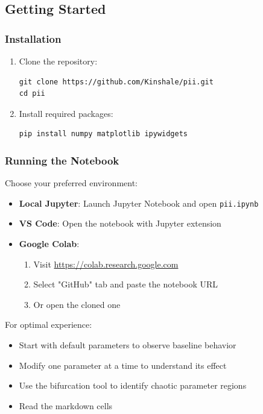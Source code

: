 \documentclass[a4paper, 10pt]{article}
\begin{document}
\subsection{Getting Started}
\subsubsection{Installation}
\begin{enumerate}
    \item Clone the repository:
    \begin{lstlisting}[style=bashstyle]
git clone https://github.com/Kinshale/pii.git
cd pii
    \end{lstlisting}

    \item Install required packages:
    \begin{lstlisting}[style=bashstyle]
pip install numpy matplotlib ipywidgets
    \end{lstlisting}
\end{enumerate}

\subsubsection{Running the Notebook}
Choose your preferred environment:
\begin{itemize}
	\item \textbf{Local Jupyter}: Launch Jupyter Notebook and open \texttt{pii.ipynb}
	\item \textbf{VS Code}: Open the notebook with Jupyter extension
	\item \textbf{Google Colab}:
	      \begin{enumerate}
		      \item Visit \url{https://colab.research.google.com}
		      \item Select "GitHub" tab and paste the notebook URL
		      \item Or open the cloned one
	      \end{enumerate}
\end{itemize}

For optimal experience:
\begin{itemize}
	\item Start with default parameters to observe baseline behavior
	\item Modify one parameter at a time to understand its effect
	\item Use the bifurcation tool to identify chaotic parameter regions
	\item Read the markdown cells
\end{itemize}
\end{document}
